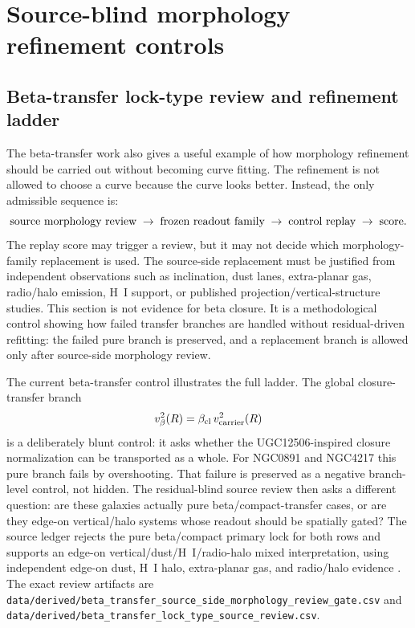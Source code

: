\documentclass[11pt]{article}
\begin{document}
\section{Source-blind morphology refinement controls}
\label{sec:transfer-refinement}

\subsection{Beta-transfer lock-type review and refinement ladder}
\label{subsec:morphology-refinement-ladder}

The beta-transfer work also gives a useful example of how morphology
refinement should be carried out without becoming curve fitting.  The
refinement is not allowed to choose a curve because the curve looks better.
Instead, the only admissible sequence is:
\[
  \hbox{source morphology review}
  \;\rightarrow\;
  \hbox{frozen readout family}
  \;\rightarrow\;
  \hbox{control replay}
  \;\rightarrow\;
  \hbox{score}.
\]
The replay score may trigger a review, but it may not decide which
morphology-family replacement is used.  The source-side replacement must be
justified from independent observations such as inclination, dust lanes,
extra-planar gas, radio/halo emission, H~I support, or published
projection/vertical-structure studies.
This section is not evidence for beta closure.  It is a methodological control
showing how failed transfer branches are handled without residual-driven
refitting: the failed pure branch is preserved, and a replacement branch is
allowed only after source-side morphology review.

The current beta-transfer control illustrates the full ladder.  The global
closure-transfer branch
\[
  v_{\beta}^{2}(R)=\beta_{\rm cl}\,v_{\rm carrier}^{2}(R)
\]
is a deliberately blunt control: it asks whether the UGC12506-inspired
closure normalization can be transported as a whole.  For NGC0891 and
NGC4217 this pure branch fails by overshooting.  That failure is preserved as
a negative branch-level control, not hidden.  The residual-blind source review
then asks a different question: are these galaxies actually pure
beta/compact-transfer cases, or are they edge-on vertical/halo systems whose
readout should be spatially gated?  The source ledger rejects the pure
beta/compact primary lock for both rows and supports an edge-on
vertical/dust/H~I/radio-halo mixed interpretation, using independent
edge-on dust, H~I halo, extra-planar gas, and radio/halo evidence
\cite{NASA2024NGC891EdgeOnBeauty,HowkSavage1997NGC891Dust,
Oosterloo2007ColdGaseousHaloNGC891,ESA2015NGC4217Hubble,
Heesen2024NGC4217Changers}.  The exact review artifacts are
\texttt{data/derived/beta\_transfer\_source\_side\_morphology\_review\_gate.csv}
and
\texttt{data/derived/beta\_transfer\_lock\_type\_source\_review.csv}.
\end{document}

